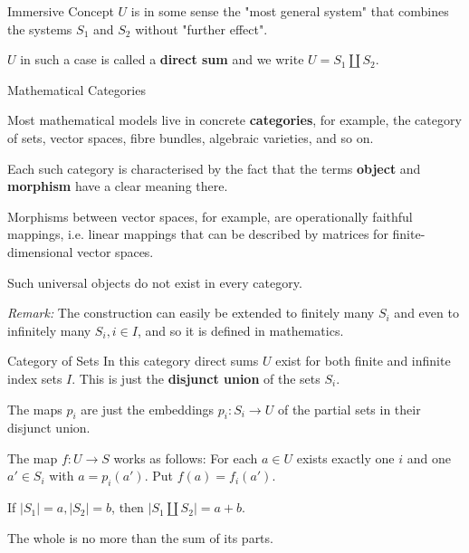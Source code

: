 \documentclass{beamer}
\begin{document}
\begin{frame}{Immersive Concept}
$U$ is in some sense the "most general system" that combines the systems $S_1$
  and $S_2$ without "further effect".
  
$U$ in such a case is called a \textbf{direct sum} and we write $U = S_1
  \coprod S_2$.
\begin{center}
\end{center}
\end{frame}
\begin{frame}{Mathematical Categories}

Most mathematical models live in concrete \textbf{categories}, for example,
the category of sets, vector spaces, fibre bundles, algebraic varieties, and
so on.

Each such category is characterised by the fact that the terms \textbf{object}
and \textbf{morphism} have a clear meaning there.

Morphisms between vector spaces, for example, are operationally faithful
mappings, i.e. linear mappings that can be described by matrices for
finite-dimensional vector spaces.

Such universal objects do not exist in every category.

\emph{Remark:} The construction can easily be extended to finitely many $S_i$
and even to infinitely many $S_i, i\in I$, and so it is defined in
mathematics.
\end{frame}
\begin{frame}{Category of Sets}
In this category direct sums $U$ exist for both finite and infinite index sets
$I$. This is just the \textbf{disjunct union} of the sets $S_i$.

The maps $p_i$ are just the embeddings $p_i: S_i \rightarrow U$ of the partial
sets in their disjunct union.

The map $f: U \rightarrow S$ works as follows: For each $a\in U$ exists
exactly one $i$ and one $a'\in S_i$ with $a=p_i(a')$. Put $f(a)=f_i(a')$.

If $|S_1| = a, |S_2| = b$, then $|S_1 \coprod S_2| = a+b$.

The whole is no more than the sum of its parts.
\end{frame}
\end{document}
